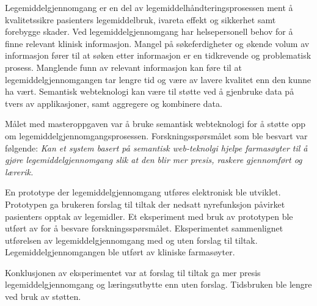 

Legemiddelgjennomgang er en del av legemiddelhåndteringsprosessen ment å kvalitetssikre pasienters legemiddelbruk, ivareta effekt og sikkerhet samt forebygge skader. Ved legemiddelgjennomgang har helsepersonell behov for å finne relevant klinisk informasjon. Mangel på søkeferdigheter og økende volum av informasjon fører til at søken etter informasjon er en tidkrevende og problematisk prosess. Manglende funn av relevant informasjon kan føre til at legemiddelgjennomgangen tar lengre tid og være av lavere kvalitet enn den kunne ha vært. Semantisk webteknologi kan være til støtte ved å gjenbruke data på tvers av applikasjoner, samt aggregere og kombinere data. 

Målet med masteroppgaven var å bruke semantisk webteknologi for å støtte opp om legemiddelgjennomgangsprosessen. Forskningsspørsmålet som ble besvart var følgende:
 \textit{Kan et system  basert på semantisk web-teknolgi hjelpe farmasøyter til å gjøre legemiddelgjennomgang slik at den blir mer presis, raskere gjennomført og lærerik.}

En prototype der legemiddelgjennomgang utføres elektronisk ble utviklet. Prototypen ga brukeren forslag til tiltak der nedsatt nyrefunksjon påvirket pasienters opptak av legemidler. Et eksperiment med bruk av prototypen ble utført av for å besvare forskningsspørsmålet. Eksperimentet sammenlignet utførelsen av legemiddelgjennomgang med og uten forslag til tiltak. Legemiddelgjennomgangen ble utført av kliniske farmasøyter.  

Konklusjonen av eksperimentet var at forslag til tiltak ga mer presis legemiddelgjennomgang og læringsutbytte enn uten forslag. Tidsbruken ble lengre ved bruk av støtten.   

